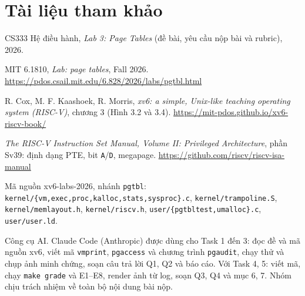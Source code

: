 \documentclass[10pt,a4paper]{article}
\newcommand{\cc}[1]{\texttt{#1}}
\begin{document}
\section{Tài liệu tham khảo}
\begin{enumerate}[label={[\arabic*]},leftmargin=2.2em,itemsep=3pt,before=\raggedright]
  \item\label{ref:cs333} CS333 Hệ điều hành, \emph{Lab 3: Page Tables} (đề bài, yêu cầu nộp bài và rubric), 2026.
  \item\label{ref:mit} MIT 6.1810, \emph{Lab: page tables}, Fall 2026. \url{https://pdos.csail.mit.edu/6.828/2026/labs/pgtbl.html}
  \item\label{ref:book} R. Cox, M. F. Kaashoek, R. Morris, \emph{xv6: a simple, Unix-like teaching operating system (RISC-V)}, chương 3 (Hình 3.2 và 3.4). \url{https://mit-pdos.github.io/xv6-riscv-book/}
  \item\label{ref:priv} \emph{The RISC-V Instruction Set Manual, Volume II: Privileged Architecture}, phần Sv39: định dạng PTE, bit \cc{A}/\cc{D}, megapage. \url{https://github.com/riscv/riscv-isa-manual}
  \item\label{ref:src} Mã nguồn xv6-labs-2026, nhánh \cc{pgtbl}: \cc{kernel/\{vm,exec,proc,kalloc,stats,sysproc\}.c}, \cc{kernel/trampoline.S}, \cc{kernel/memlayout.h}, \cc{kernel/riscv.h}, \cc{user/\{pgtbltest,umalloc\}.c}, \cc{user/user.ld}.
  \item Công cụ AI. Claude Code (Anthropic) được dùng cho Task 1 đến 3: đọc đề và mã nguồn xv6, viết mã \cc{vmprint}, \cc{pgaccess} và chương trình \cc{pgaudit}, chạy thử và chụp ảnh minh chứng, soạn câu trả lời Q1, Q2 và báo cáo. Với Task 4, 5: viết mã, chạy \cc{make grade} và E1--E8, render ảnh từ log, soạn Q3, Q4 và mục 6, 7. Nhóm chịu trách nhiệm về toàn bộ nội dung bài nộp.
\end{enumerate}
\end{document}
